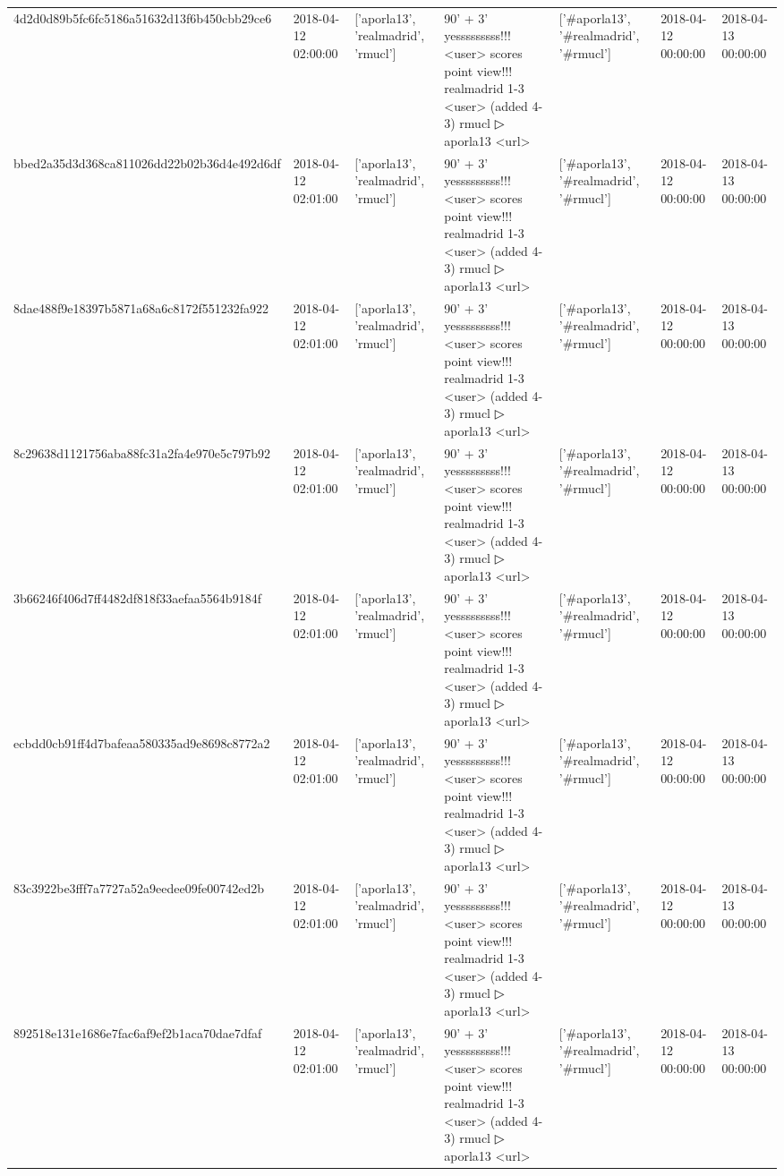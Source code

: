 \begin{tabular}{lllllll}
4d2d0d89b5fc6fc5186a51632d13f6b450cbb29ce6 & 2018-04-12 02:00:00 & ['aporla13', 'realmadrid', 'rmucl'] & 90' + 3' yesssssssss!!! <user> scores point view!!! realmadrid 1-3 <user> (added 4-3) rmucl ▷ aporla13 <url> & ['#aporla13', '#realmadrid', '#rmucl'] & 2018-04-12 00:00:00 & 2018-04-13 00:00:00 \\
bbed2a35d3d368ca811026dd22b02b36d4e492d6df & 2018-04-12 02:01:00 & ['aporla13', 'realmadrid', 'rmucl'] & 90' + 3' yesssssssss!!! <user> scores point view!!! realmadrid 1-3 <user> (added 4-3) rmucl ▷ aporla13 <url> & ['#aporla13', '#realmadrid', '#rmucl'] & 2018-04-12 00:00:00 & 2018-04-13 00:00:00 \\
8dae488f9e18397b5871a68a6c8172f551232fa922 & 2018-04-12 02:01:00 & ['aporla13', 'realmadrid', 'rmucl'] & 90' + 3' yesssssssss!!! <user> scores point view!!! realmadrid 1-3 <user> (added 4-3) rmucl ▷ aporla13 <url> & ['#aporla13', '#realmadrid', '#rmucl'] & 2018-04-12 00:00:00 & 2018-04-13 00:00:00 \\
8c29638d1121756aba88fc31a2fa4e970e5c797b92 & 2018-04-12 02:01:00 & ['aporla13', 'realmadrid', 'rmucl'] & 90' + 3' yesssssssss!!! <user> scores point view!!! realmadrid 1-3 <user> (added 4-3) rmucl ▷ aporla13 <url> & ['#aporla13', '#realmadrid', '#rmucl'] & 2018-04-12 00:00:00 & 2018-04-13 00:00:00 \\
3b66246f406d7ff4482df818f33aefaa5564b9184f & 2018-04-12 02:01:00 & ['aporla13', 'realmadrid', 'rmucl'] & 90' + 3' yesssssssss!!! <user> scores point view!!! realmadrid 1-3 <user> (added 4-3) rmucl ▷ aporla13 <url> & ['#aporla13', '#realmadrid', '#rmucl'] & 2018-04-12 00:00:00 & 2018-04-13 00:00:00 \\
ecbdd0cb91ff4d7bafeaa580335ad9e8698c8772a2 & 2018-04-12 02:01:00 & ['aporla13', 'realmadrid', 'rmucl'] & 90' + 3' yesssssssss!!! <user> scores point view!!! realmadrid 1-3 <user> (added 4-3) rmucl ▷ aporla13 <url> & ['#aporla13', '#realmadrid', '#rmucl'] & 2018-04-12 00:00:00 & 2018-04-13 00:00:00 \\
83c3922be3fff7a7727a52a9eedee09fe00742ed2b & 2018-04-12 02:01:00 & ['aporla13', 'realmadrid', 'rmucl'] & 90' + 3' yesssssssss!!! <user> scores point view!!! realmadrid 1-3 <user> (added 4-3) rmucl ▷ aporla13 <url> & ['#aporla13', '#realmadrid', '#rmucl'] & 2018-04-12 00:00:00 & 2018-04-13 00:00:00 \\
892518e131e1686e7fac6af9ef2b1aca70dae7dfaf & 2018-04-12 02:01:00 & ['aporla13', 'realmadrid', 'rmucl'] & 90' + 3' yesssssssss!!! <user> scores point view!!! realmadrid 1-3 <user> (added 4-3) rmucl ▷ aporla13 <url> & ['#aporla13', '#realmadrid', '#rmucl'] & 2018-04-12 00:00:00 & 2018-04-13 00:00:00 \\

\end{tabular}
